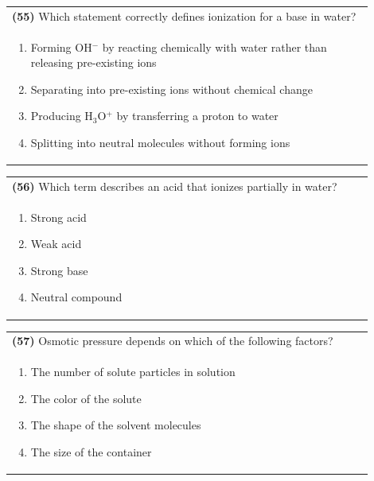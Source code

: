 \documentclass{article}
\begin{document}
\noindent\begin{tabular}{|p{0.9\linewidth}|}
\hline
\textbf{(55)} Which statement correctly defines ionization for a base in water? \\[0.2cm]
\begin{minipage}[t]{0.85\linewidth}
\begin{enumerate}[label=\alph*.]
\item Forming OH$^-$ by reacting chemically with water rather than releasing pre-existing ions
\item Separating into pre-existing ions without chemical change
\item Producing H$_3$O$^+$ by transferring a proton to water
\item Splitting into neutral molecules without forming ions
\end{enumerate}
\end{minipage}\\[0.2cm]
\hline
\end{tabular}

\noindent\begin{tabular}{|p{0.9\linewidth}|}
\hline
\textbf{(56)} Which term describes an acid that ionizes partially in water? \\[0.2cm]
\begin{minipage}[t]{0.85\linewidth}
\begin{enumerate}[label=\alph*.]
\item Strong acid \item Weak acid \item Strong base \item Neutral compound
\end{enumerate}
\end{minipage}\\[0.2cm]
\hline
\end{tabular}

\noindent\begin{tabular}{|p{0.9\linewidth}|}
\hline
\textbf{(57)} Osmotic pressure depends on which of the following factors?\\[0.2cm]
\begin{minipage}[t]{0.85\linewidth}
\begin{enumerate}[label=\alph*.]
\item The number of solute particles in solution
\item The color of the solute
\item The shape of the solvent molecules
\item The size of the container
\end{enumerate}
\end{minipage}\\[0.2cm]
\hline
\end{tabular}
\end{document}
